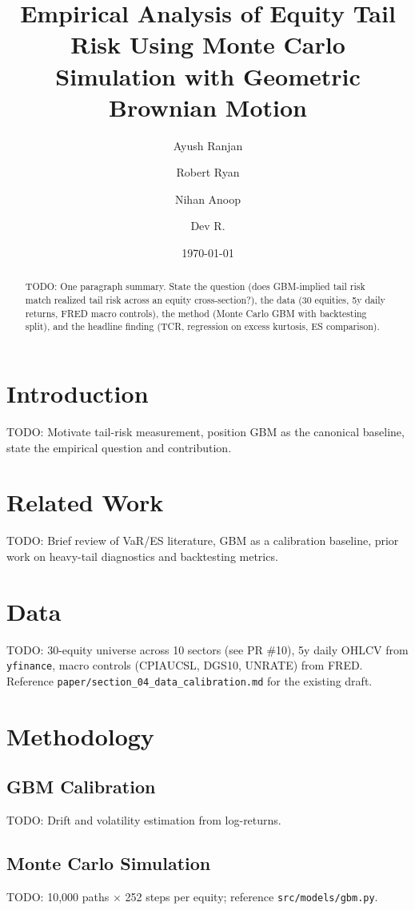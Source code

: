 \documentclass[11pt,a4paper]{article}
\title{Empirical Analysis of Equity Tail Risk Using Monte Carlo Simulation with Geometric Brownian Motion}
\author{Ayush Ranjan \and Robert Ryan \and Nihan Anoop \and Dev R.}
\date{\today}
\begin{document}
\maketitle

\begin{abstract}
TODO: One paragraph summary. State the question (does GBM-implied tail risk match
realized tail risk across an equity cross-section?), the data (30 equities, 5y daily
returns, FRED macro controls), the method (Monte Carlo GBM with backtesting split),
and the headline finding (TCR, regression on excess kurtosis, ES comparison).
\end{abstract}

\section{Introduction}\label{sec:introduction}
TODO: Motivate tail-risk measurement, position GBM as the canonical baseline, state
the empirical question and contribution.

\section{Related Work}\label{sec:related}
TODO: Brief review of VaR/ES literature, GBM as a calibration baseline, prior
work on heavy-tail diagnostics and backtesting metrics.

\section{Data}\label{sec:data}
TODO: 30-equity universe across 10 sectors (see PR \#10), 5y daily OHLCV from
\texttt{yfinance}, macro controls (CPIAUCSL, DGS10, UNRATE) from FRED.
Reference \texttt{paper/section\_04\_data\_calibration.md} for the existing draft.

\section{Methodology}\label{sec:methodology}
\subsection{GBM Calibration}
TODO: Drift and volatility estimation from log-returns.

\subsection{Monte Carlo Simulation}
TODO: 10{,}000 paths $\times$ 252 steps per equity; reference \texttt{src/models/gbm.py}.
\end{document}
